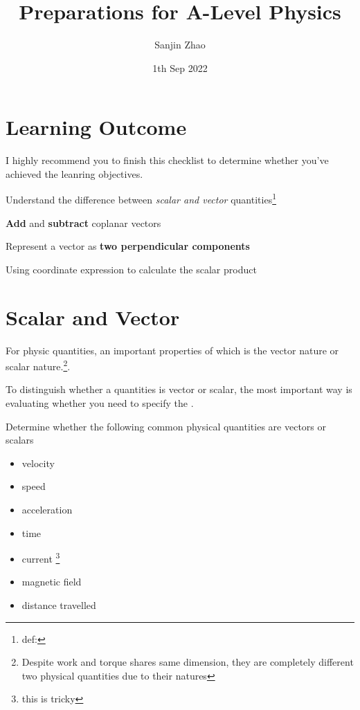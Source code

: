 \documentclass[a4paper]{tufte-handout}
\title{Preparations for A-Level Physics}
\author{Sanjin Zhao}
\date{1th Sep 2022}  %
\newenvironment{TaskBox} %
{\begin{tcolorbox}[breakable,colback=b1!30,colframe=b1,title=Task]} {\end{tcolorbox}}
\begin{document}
\maketitle%

\section*{Learning Outcome}
I highly recommend you to finish this checklist to determine whether you've achieved the leanring objectives.

\begin{todolist}
	\item Understand the difference between \emph{scalar and vector} quantities\footnote{def:}
	\item \textbf{Add} and \textbf{subtract} coplanar vectors
	\item Represent a vector as \textbf{two perpendicular components}
	\item Using coordinate expression to calculate the scalar product
\end{todolist}
\clearpage

\section{Scalar and Vector}
For physic quantities, an important properties of which is the vector nature or scalar nature.\footnote{Despite work and torque shares same dimension, they are completely different two physical quantities due to their natures}. 

To distinguish whether a quantities is vector or scalar, the most important way is evaluating whether you need to specify the \uline{\hspace{1 in}}.

\begin{TaskBox}
Determine whether the following common physical quantities are vectors or scalars
\begin{itemize}
	\item velocity
	\item speed
	\item acceleration
	\item time
	\item current \footnote{this is tricky}
	\item magnetic field
	\item distance travelled
\end{itemize}
\end{TaskBox}
\end{document}
